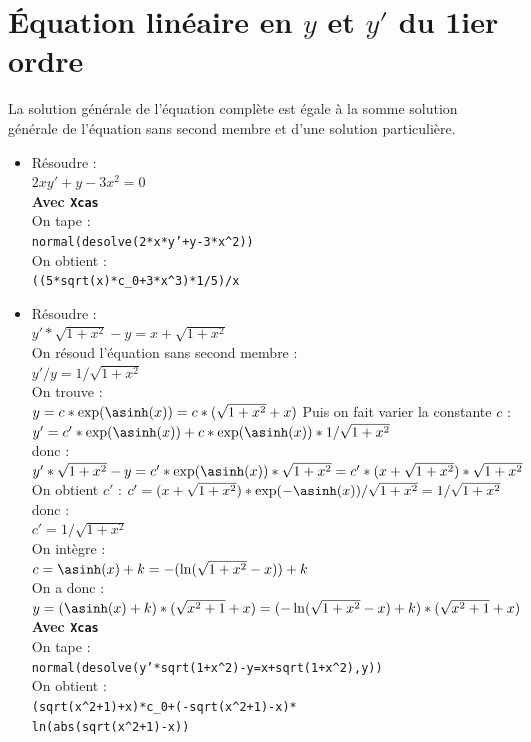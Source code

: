\documentclass[a4paper,11pt]{book}
\begin{document}
\section{\'Equation lin\'eaire en $y$ et $y'$ du 1ier ordre}
La solution g\'en\'erale de l'\'equation compl\`ete est \'egale \`a la somme
 solution g\'en\'erale de l'\'equation sans second membre et d'une solution 
particuli\`ere.
\begin{itemize}
\item R\'esoudre :\\
$2xy'+y-3x^2=0$\\
{\bf Avec {\tt Xcas}}\\
On tape :\\
{\tt normal(desolve(2*x*y'+y-3*x\verb|^|2))}\\
On obtient :\\
{\tt((5*sqrt(x)*c\_0+3*x\verb|^|3)*1/5)/x }\\
\item  R\'esoudre :\\
$y'*\sqrt{1+x^2}-y=x+\sqrt{1+x^2}$\\
On r\'esoud l'\'equation sans second membre :\\
$y'/y=1/\sqrt{1+x^2}$\\
On trouve :\\
$y=c*\exp(\asinh(x))=c*(\sqrt{1+x^2}+x)$
Puis on fait varier la constante $c$ :\\
$y'=c'*\exp(\asinh(x))+c*\exp(\asinh(x))*1/\sqrt{1+x^2}$\\
donc :\\
$y'*\sqrt{1+x^2}-y=c'*\exp(\asinh(x))*\sqrt{1+x^2}=c'*(x+\sqrt{1+x^2})*\sqrt{1+x^2}$\\
On obtient $c'$ :
$c'=(x+\sqrt{1+x^2})*\exp(-\asinh(x))/\sqrt{1+x^2}=1/\sqrt{1+x^2}$
donc :\\
$c'=1/\sqrt{1+x^2}$\\
On int\`egre :\\
$c=\asinh(x)+k=-(\ln(\sqrt{1+x^2}-x))+k$\\
On a donc :\\
$y=(\asinh(x)+k)*(\sqrt{x^2+1}+x)=(-\ln(\sqrt{1+x^2}-x)+k)*(\sqrt{x^2+1}+x)$\\
{\bf Avec {\tt Xcas}}\\
On tape :\\
{\tt normal(desolve(y'*sqrt(1+x\verb|^|2)-y=x+sqrt(1+x\verb|^|2),y))}\\
On obtient :\\
{\tt (sqrt(x\verb|^|2+1)+x)*c\_0+(-sqrt(x\verb|^|2+1)-x)*\\
ln(abs(sqrt(x\verb|^|2+1)-x))}
\end{itemize}
\end{document}
